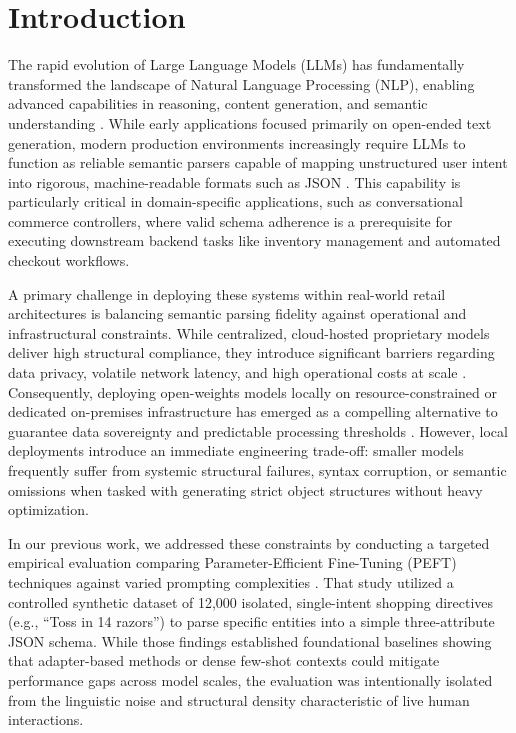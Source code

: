 \documentclass[journal,article,submit,pdftex,moreauthors]{Definitions/mdpi}
\begin{document}

\section{Introduction}
The rapid evolution of Large Language Models (LLMs) has fundamentally transformed the landscape of Natural Language Processing (NLP), enabling advanced capabilities in reasoning, content generation, and semantic understanding \citep{karlovic2026}. While early applications focused primarily on open-ended text generation, modern production environments increasingly require LLMs to function as reliable semantic parsers capable of mapping unstructured user intent into rigorous, machine-readable formats such as JSON \citep{daiberdispatchqa, tenckhoff2026llmstructbench}. This capability is particularly critical in domain-specific applications, such as conversational commerce controllers, where valid schema adherence is a prerequisite for executing downstream backend tasks like inventory management and automated checkout workflows.

A primary challenge in deploying these systems within real-world retail architectures is balancing semantic parsing fidelity against operational and infrastructural constraints. While centralized, cloud-hosted proprietary models deliver high structural compliance, they introduce significant barriers regarding data privacy, volatile network latency, and high operational costs at scale \citep{ahmad2025multi}. Consequently, deploying open-weights models locally on resource-constrained or dedicated on-premises infrastructure has emerged as a compelling alternative to guarantee data sovereignty and predictable processing thresholds \citep{satija2026fastworkflow}. However, local deployments introduce an immediate engineering trade-off: smaller models frequently suffer from systemic structural failures, syntax corruption, or semantic omissions when tasked with generating strict object structures without heavy optimization.

In our previous work, we addressed these constraints by conducting a targeted empirical evaluation comparing Parameter-Efficient Fine-Tuning (PEFT) techniques against varied prompting complexities \citep{karlovic2026}. That study utilized a controlled synthetic dataset of 12,000 isolated, single-intent shopping directives (e.g., ``Toss in 14 razors'') to parse specific entities into a simple three-attribute JSON schema. While those findings established foundational baselines showing that adapter-based methods or dense few-shot contexts could mitigate performance gaps across model scales, the evaluation was intentionally isolated from the linguistic noise and structural density characteristic of live human interactions. 
\end{document}
